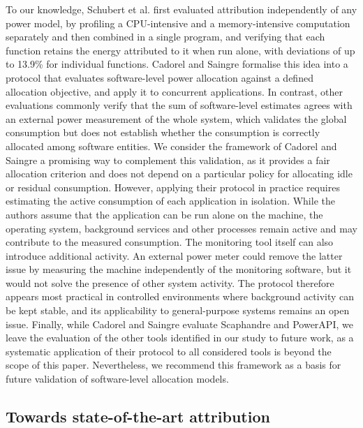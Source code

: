 \documentclass[
  acmsmall,
  screen,
  review,
  xcolor={dvipsnames,usenames}
]{acmart}
\begin{document}
To our knowledge, Schubert et al. \cite{schubertProfilingSoftwareEnergy2012} first evaluated attribution independently of any power model, by profiling a CPU-intensive and a memory-intensive computation separately and then combined in a single program, and verifying that each function retains the energy attributed to it when run alone, with deviations of up to 13.9\% for individual functions. Cadorel and Saingre \cite{cadorelProtocolAssessAccuracy2024b} formalise this idea into a protocol that evaluates software-level power allocation against a defined allocation objective, and apply it to concurrent applications. In contrast, other evaluations \cite{noureddineESurgeonDiagnosingEnergy2012} commonly verify that the sum of software-level estimates agrees with an external power measurement of the whole system, which validates the global consumption but does not establish whether the consumption is correctly allocated among software entities. We consider the framework of Cadorel and Saingre a promising way to complement this validation, as it provides a fair allocation criterion and does not depend on a particular policy for allocating idle or residual consumption. However, applying their protocol in practice requires estimating the active consumption of each application in isolation. While the authors assume that the application can be run alone on the machine, the operating system, background services and other processes remain active and may contribute to the measured consumption. The monitoring tool itself can also introduce additional activity. An external power meter could remove the latter issue by measuring the machine independently of the monitoring software, but it would not solve the presence of other system activity. The protocol therefore appears most practical in controlled environments where background activity can be kept stable, and its applicability to general-purpose systems remains an open issue. Finally, while Cadorel and Saingre evaluate Scaphandre and PowerAPI, we leave the evaluation of the other tools identified in our study to future work, as a systematic application of their protocol to all considered tools is beyond the scope of this paper. Nevertheless, we recommend this framework as a basis for future validation of software-level allocation models.

\subsection{Towards state-of-the-art attribution}
\end{document}
